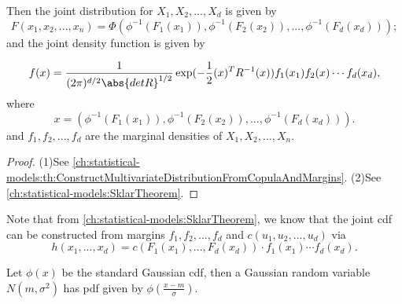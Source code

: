 \begin{refsection}
\begin{lemma}
	Then the joint distribution for $X_1,X_2,...,X_d$ is given by
	$$F(x_1,x_2,...,x_n) = \Phi(\phi^{-1}(F_1(x_1)),\phi^{-1}(F_2(x_2)),...,\phi^{-1}(F_d(x_d)));$$
	and the joint density function is given by
	
	$$f(x)= \frac{1}{(2\pi)^{d/2}\abs{det  R}^{1/2}}\exp(-\frac{1}{2}(x)^T R^{-1}(x))f_1(x_1)f_2(x)\cdots f_d(x_d), $$
	where $$x=(\phi^{-1}(F_1(x_1)),\phi^{-1}(F_2(x_2)),...,\phi^{-1}(F_d(x_d))).$$
	and $f_1,f_2,...,f_d$ are the marginal densities of $X_1,X_2,...,X_n$.
\end{lemma}
\begin{proof}
	(1)See \autoref{ch:statistical-models:th:ConstructMultivariateDistributionFromCopulaAndMargins}.
	(2)See \autoref{ch:statistical-models:SklarTheorem}. 
\end{proof}

\begin{example}
Note that from \autoref{ch:statistical-models:SklarTheorem}, we know that the joint cdf can be constructed from margins $f_1,f_2,...,f_d$ and $c(u_1,u_2,...,u_d)$ via
$$h(x_1,...,x_d) = c(F_1(x_1),...,F_d(x_d))\cdot f_1(x_1)\cdots f_d(x_d).$$

Let $\phi(x)$ be the standard Gaussian cdf, then a Gaussian random variable $N(m,\sigma^2)$ has pdf given by $\phi(\frac{x-m}{\sigma})$.


\end{example}
\end{refsection}
